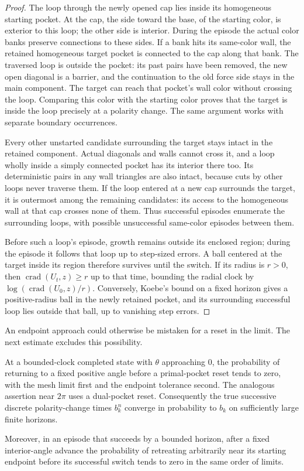 \begin{proof}
The loop through the newly opened cap lies inside its homogeneous
starting pocket.  At the cap, the side toward the base, of the
starting color, is exterior to this loop; the other side is interior.
During the episode the actual color banks preserve connections to
these sides.  If a bank hits its same-color wall, the retained
homogeneous target pocket is connected to the cap along that bank.
The traversed loop is outside the pocket: its past pairs have been
removed, the new open diagonal is a barrier, and the continuation to
the old force side stays in the main component.  The target can reach
that pocket's wall color without crossing the loop.  Comparing this
color with the starting color proves that the target is inside the
loop precisely at a polarity change.  The same argument works with
separate boundary occurrences.

Every other unstarted candidate surrounding the target stays intact
in the retained component.  Actual diagonals and walls cannot cross
it, and a loop wholly inside a simply connected pocket has its
interior there too.  Its deterministic pairs in any wall triangles
are also intact, because cuts by other loops never traverse them.
If the loop entered at a new cap surrounds the target, it is outermost
among the remaining candidates: its access to the homogeneous wall
at that cap crosses none of them.  Thus successful episodes enumerate
the surrounding loops, with possible unsuccessful same-color episodes
between them.

Before such a loop's episode, growth remains outside its enclosed
region; during the episode it follows that loop up to step-sized
errors.  A ball centered at the target inside its region therefore
survives until the switch.  If its radius is $r>0$, then
$\operatorname{crad}(U_t,z)\ge r$ up to that time, bounding the
radial clock by $\log(\operatorname{crad}(U_0,z)/r)$.
Conversely, Koebe's bound on a fixed horizon gives a positive-radius
ball in the newly retained pocket, and its surrounding successful
loop lies outside that ball, up to vanishing step errors.
\end{proof}

An endpoint approach could otherwise be mistaken for a reset in the
limit.  The next estimate excludes this possibility.

\begin{lemma}
\label{loop:no-skip}
At a bounded-clock completed state with $\theta$ approaching $0$,
the probability of returning to a fixed positive angle before a
primal-pocket reset tends to zero, with the mesh limit first and the
endpoint tolerance second.  The analogous assertion near $2\pi$
uses a dual-pocket reset.  Consequently the true successive discrete
polarity-change times $b_k^n$ converge in probability to $b_k$ on
sufficiently large finite horizons.

Moreover, in an episode that succeeds by a bounded horizon, after a
fixed interior-angle advance the probability of retreating arbitrarily
near its starting endpoint before its successful switch tends to zero
in the same order of limits.
\end{lemma}

